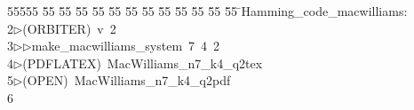 %
%
\begin{tabbing}
55555 \= 55 \= 55 \= 55 \= 55 \= 55 \= 55 \= 55 \= 55 \= 55 \= 55 \= 55 \= 55 \= \>Hamming\_code\_macwilliams:\\[0pt]
2\>$\triangleright$\>(ORBITER)\ v\ 2\ \\[0pt]
3\>$\triangleright$\>$\triangleright$\>make\_macwilliams\_system\ 7\ 4\ 2\\[0pt]
4\>$\triangleright$\>(PDFLATEX)\ MacWilliams\_n7\_k4\_q2tex\\[0pt]
5\>$\triangleright$\>(OPEN)\ MacWilliams\_n7\_k4\_q2pdf\\[0pt]
6\>\end{tabbing}
